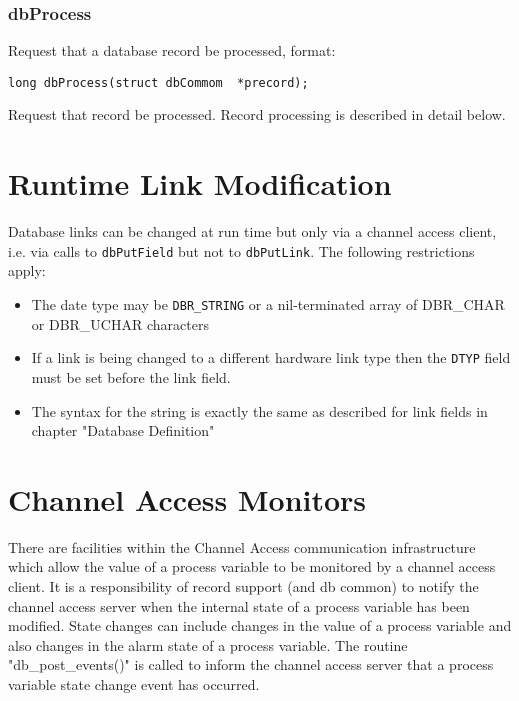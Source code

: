 \subsubsection{dbProcess }

Request that a database record be processed, format:

\begin{verbatim}long dbProcess(struct dbCommom  *precord);
\end{verbatim}Request that record be processed. Record processing is described in detail below.

\section{Runtime Link Modification}

Database links can be changed at run time but only via a channel access client, i.e. via calls to \verb|dbPutField| but not to 
\verb|dbPutLink|. The following restrictions apply:

\begin{itemize}\item The date type may be \verb|DBR_STRING| or a nil-terminated array of DBR\_CHAR or DBR\_UCHAR characters

\item If a link is being changed to a different hardware link type then the \verb|DTYP| field must be set before the link field.

\item The syntax for the string is exactly the same as described for link fields in chapter "Database Definition"

\end{itemize}\section{Channel Access Monitors}

There are facilities within the Channel Access communication infrastructure which allow the value of a process variable 
to be monitored by a channel access client. It is a responsibility of record support (and db common) to notify the channel 
access server when the internal state of a process variable has been modified. State changes can include changes in the 
value of a process variable and also changes in the alarm state of a process variable. The routine "db\_post\_events()" is 
called to inform the channel access server that a process variable state change event has occurred.

